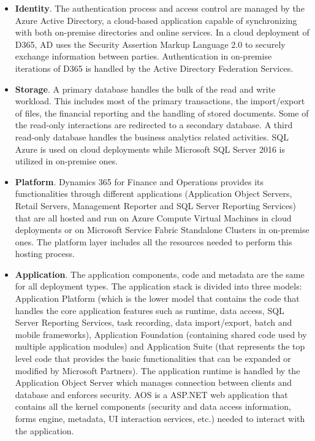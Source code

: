 \begin{itemize}
    \item \textbf{Identity}. The authentication process and access control are managed by the Azure Active Directory, a cloud-based application capable of synchronizing with both on-premise directories and online services. In a cloud deployment of D365, AD uses the Security Assertion Markup Language 2.0 to securely exchange information between parties. Authentication in on-premise iterations of D365 is handled by the Active Directory Federation Services.
    
    \item \textbf{Storage}. A primary database handles the bulk of the read and write workload. This includes most of the primary transactions, the import/export of files, the financial reporting and the handling of stored documents. Some of the read-only interactions are redirected to a secondary database. A third read-only database handles the business analytics related activities. SQL Azure is used on cloud deployments while Microsoft SQL Server 2016 is utilized in on-premise ones.
    
    \item \textbf{Platform}. Dynamics 365 for Finance and Operations provides its functionalities through different applications (Application Object Servers, Retail Servers, Management Reporter and SQL Server Reporting Services) that are all hosted and run on Azure Compute Virtual Machines in cloud deployments or on Microsoft Service Fabric Standalone Clusters in on-premise ones. The platform layer includes all the resources needed to perform this hosting process. 
    
    \item \textbf{Application}. The application components, code and metadata are the same for all deployment types. The application stack is divided into three models: Application Platform (which is the lower model that contains the code that handles the core application features such as runtime, data access, SQL Server Reporting Services, task recording, data import/export, batch and mobile frameworks), Application Foundation (containing shared code used by multiple application modules) and Application Suite (that represents the top level code that provides the basic functionalities that can be expanded or modified by Microsoft Partners). The application runtime is handled by the Application Object Server which manages connection between clients and database and enforces security. AOS is a ASP.NET web application that contains all the kernel components (security and data access information, forms engine, metadata, UI interaction services, etc.) needed to interact with the application.
        

\end{itemize}
